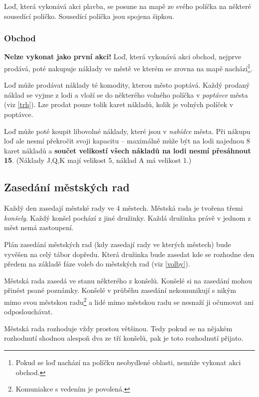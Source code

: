 \documentclass[a4paper, 12pt, twoside]{article}
\begin{document}
Loď, která vykonává akci plavba, se posune na mapě ze svého políčka na některé sousedící políčko.  Sousedící políčka jsou spojena šipkou.

\subsubsection{Obchod}
\label{tah:obchod}

\textbf{Nelze vykonat jako první akci!}  Loď, která vykonává akci obchod, nejprve prodává, poté nakupuje náklady ve městě ve kterém se zrovna na mapě nachází\footnote{Pokud se loď nachází na políčku
neobydlené oblasti, nemůže vykonat akci obchod.}.

Loď může prodávat náklady té komodity, kterou město poptává.  Každý prodaný náklad se vyjme z lodi a vloží se do některého volného políčka v \emph{poptávce}
města (viz \ref{trh}).  Lze prodat pouze tolik karet nákladů, kolik je volných políček v poptávce.  

Loď může poté koupit libovolné náklady, které jsou v \emph{nabídce} města.  Při nákupu loď ale nesmí překročit svoji kapacitu -- maximálně může být na lodi
najednou 8 karet nákladů a \textbf{součet velikostí všech nákladů na lodi nesmí přesáhnout 15}.  (Náklady J,Q,K mají velikost 5, náklad A má velikost 1.)

\subsection{Zasedání městských rad}
\label{mestska_rada}

Každý den zasedají městské rady ve 4 městech.  Městská rada je tvořena třemi \emph{konšely}.  Každý konšel pochází z jiné družinky.  Každá družinka
právě v jednom z měst nemá zastoupení.

Plán zasedání městských rad (kdy zasedají rady ve kterých městech) bude vyvěšen na celý tábor dopředu.  
Která družinka bude zasedat kde se rozhodne den předem na základě fáze voleb do městských rad (viz \ref{volby}).

Městská rada zasedá ve stanu některého z konšelů.  Konšelé si na zasedání mohou přinést psané poznámky.  Konšelé v průběhu zasedání nekomunikují s nikým
mimo svou městskou radu\footnote{Komuniakce s vedením je povolená.} a lidé mimo městskou radu se nesnaží ji očumovat ani odposlouchávat.

Městská rada rozhoduje vždy prostou většinou.  Tedy pokud se na nějakém rozhodnutí shodnou alespoň dva ze tří konšelů, pak je toto rozhodnutí přijato.
\end{document}

